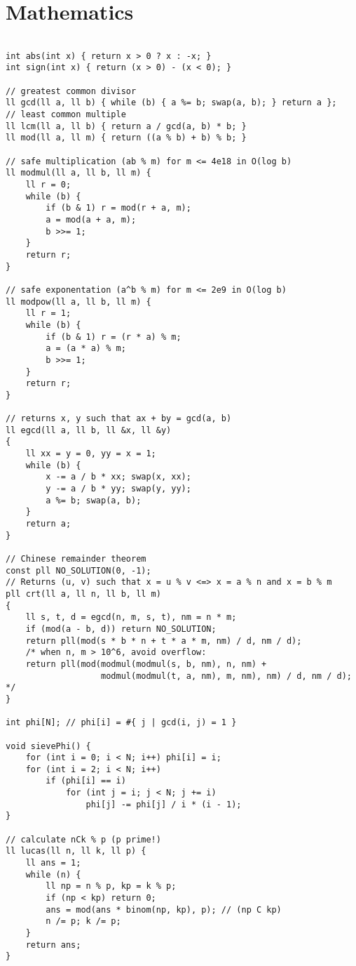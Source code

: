 \documentclass{article}
\begin{document}
\section{Mathematics}

\begin{lstlisting}

int abs(int x) { return x > 0 ? x : -x; }
int sign(int x) { return (x > 0) - (x < 0); }

// greatest common divisor
ll gcd(ll a, ll b) { while (b) { a %= b; swap(a, b); } return a };
// least common multiple
ll lcm(ll a, ll b) { return a / gcd(a, b) * b; }
ll mod(ll a, ll m) { return ((a % b) + b) % b; }

// safe multiplication (ab % m) for m <= 4e18 in O(log b)
ll modmul(ll a, ll b, ll m) {
	ll r = 0;
	while (b) {
		if (b & 1) r = mod(r + a, m);
		a = mod(a + a, m);
		b >>= 1;
	}
	return r;
}

// safe exponentation (a^b % m) for m <= 2e9 in O(log b)
ll modpow(ll a, ll b, ll m) {
	ll r = 1;
	while (b) {
		if (b & 1) r = (r * a) % m;
		a = (a * a) % m;
		b >>= 1;
	}
	return r;
}

// returns x, y such that ax + by = gcd(a, b)
ll egcd(ll a, ll b, ll &x, ll &y)
{
	ll xx = y = 0, yy = x = 1;
	while (b) {
		x -= a / b * xx; swap(x, xx);
		y -= a / b * yy; swap(y, yy);
		a %= b; swap(a, b);
	}
	return a;
}

// Chinese remainder theorem
const pll NO_SOLUTION(0, -1);
// Returns (u, v) such that x = u % v <=> x = a % n and x = b % m
pll crt(ll a, ll n, ll b, ll m)
{
	ll s, t, d = egcd(n, m, s, t), nm = n * m;
	if (mod(a - b, d)) return NO_SOLUTION;
	return pll(mod(s * b * n + t * a * m, nm) / d, nm / d);
	/* when n, m > 10^6, avoid overflow:
	return pll(mod(modmul(modmul(s, b, nm), n, nm) + 
				   modmul(modmul(t, a, nm), m, nm), nm) / d, nm / d); */
}

int phi[N]; // phi[i] = #{ j | gcd(i, j) = 1 }

void sievePhi() {
	for (int i = 0; i < N; i++) phi[i] = i;
	for (int i = 2; i < N; i++)
		if (phi[i] == i)
			for (int j = i; j < N; j += i)
				phi[j] -= phi[j] / i * (i - 1);
}

// calculate nCk % p (p prime!)
ll lucas(ll n, ll k, ll p) {
	ll ans = 1;
	while (n) {
		ll np = n % p, kp = k % p;
		if (np < kp) return 0;
		ans = mod(ans * binom(np, kp), p); // (np C kp)
		n /= p; k /= p;
	}
	return ans;
}

\end{lstlisting}
\end{document}
